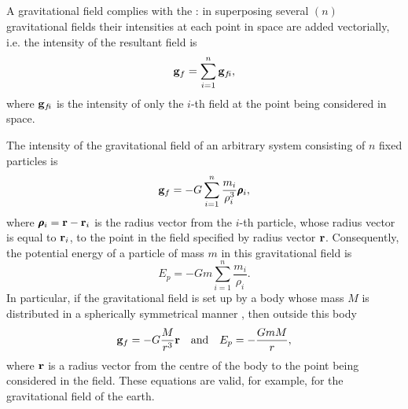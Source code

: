 \subsection{}\label{6.2.3} A gravitational field complies with the : in superposing several $(n)$ gravitational fields their intensities at each point in space are added vectorially, i.e. the intensity of the resultant field is
\begin{equation*}%
\vb{g}_{f} = \sum_{i=1}^{n} \vb{g}_{f\!i},
\end{equation*}
where $\vb{g}_{f\!i}$ is the intensity of only the $i$-th field at the point being considered in space.

The intensity of the gravitational field of an arbitrary system consisting of $n$ fixed particles is
\begin{equation*}%
\vb{g}_{f} = - G \sum_{i=1}^{n} \frac{m_{i}}{\rho_{i}^{3}} \pmb{\rho}_{i},
\end{equation*}
where $\pmb{\rho}_{i} = \vb{r} - \vb{r}_{i}$ is the radius vector from the $i$-th particle, whose radius vector is equal to $\vb{r}_{i}$, to the point in the field spec­ified by radius vector $\vb{r}$. Consequently, the potential energy of a particle of mass $m$ in this gravitational field is
\begin{equation*}%
E_{p} = - Gm \sum_{i=1}^{n} \frac{m_{i}}{\rho_{i}}.
\end{equation*}
In particular, if the gravitational field is set up by a body whose mass $M$ is distributed in a spherically symmetrical manner , then outside this body
\begin{equation*}%
\vb{g}_{f} = - G \frac{M}{r^{3}} \vb{r}\quad \textrm{and}\quad E_{p} = -\frac{GmM}{r},
\end{equation*}
where $\vb{r}$ is a radius vector from the centre of the body to the point being considered in the field. These equations are valid, for example, for the gravitational field of the earth.

